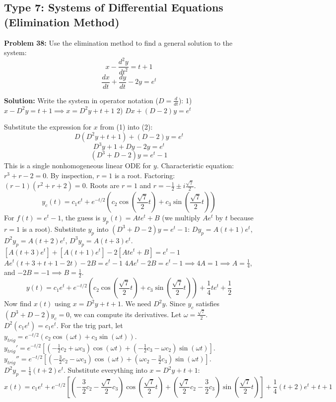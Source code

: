 \documentclass[11pt]{article}
\begin{document}
\subsection{Type 7: Systems of Differential Equations (Elimination Method)}

\textbf{Problem 38:} Use the elimination method to find a general solution to the system:
\[ x - \frac{d^2 y}{dt^2} = t + 1 \]
\[ \frac{dx}{dt} + \frac{dy}{dt} - 2y = e^t \]

\textbf{Solution:}
Write the system in operator notation ($D = \frac{d}{dt}$):
1) $x - D^2 y = t + 1 \implies x = D^2 y + t + 1$
2) $Dx + (D - 2)y = e^t$

Substitute the expression for $x$ from (1) into (2):
\[ D(D^2 y + t + 1) + (D - 2)y = e^t \]
\[ D^3 y + 1 + Dy - 2y = e^t \]
\[ (D^3 + D - 2)y = e^t - 1 \]
This is a single nonhomogeneous linear ODE for $y$.
Characteristic equation: $r^3 + r - 2 = 0$.
By inspection, $r = 1$ is a root. Factoring: $(r - 1)(r^2 + r + 2) = 0$.
Roots are $r = 1$ and $r = -\frac{1}{2} \pm i\frac{\sqrt{7}}{2}$.
\[ y_c(t) = c_1 e^t + e^{-t/2} \left( c_2 \cos\left(\frac{\sqrt{7}}{2}t\right) + c_3 \sin\left(\frac{\sqrt{7}}{2}t\right) \right) \]
For $f(t) = e^t - 1$, the guess is $y_p(t) = A t e^t + B$ (we multiply $A e^t$ by $t$ because $r=1$ is a root).
Substitute $y_p$ into $(D^3 + D - 2)y = e^t - 1$:
$D y_p = A(t+1)e^t$, $D^2 y_p = A(t+2)e^t$, $D^3 y_p = A(t+3)e^t$.
$[A(t+3)e^t] + [A(t+1)e^t] - 2[A t e^t + B] = e^t - 1$
$A e^t (t + 3 + t + 1 - 2t) - 2B = e^t - 1$
$4A e^t - 2B = e^t - 1 \implies 4A = 1 \implies A = \frac{1}{4}$, and $-2B = -1 \implies B = \frac{1}{2}$.
\[ y(t) = c_1 e^t + e^{-t/2} \left( c_2 \cos\left(\frac{\sqrt{7}}{2}t\right) + c_3 \sin\left(\frac{\sqrt{7}}{2}t\right) \right) + \frac{1}{4} t e^t + \frac{1}{2} \]
Now find $x(t)$ using $x = D^2 y + t + 1$.
We need $D^2 y$. Since $y_c$ satisfies $(D^3 + D - 2)y_c = 0$, we can compute its derivatives. Let $\omega = \frac{\sqrt{7}}{2}$.
$D^2(c_1 e^t) = c_1 e^t$.
For the trig part, let $y_{trig} = e^{-t/2}(c_2 \cos(\omega t) + c_3 \sin(\omega t))$.
$y_{trig}' = e^{-t/2} \left[ (-\frac{1}{2}c_2 + \omega c_3)\cos(\omega t) + (-\frac{1}{2}c_3 - \omega c_2)\sin(\omega t) \right]$.
$y_{trig}'' = e^{-t/2} \left[ (-\frac{3}{2}c_2 - \omega c_3)\cos(\omega t) + (\omega c_2 - \frac{3}{2}c_3)\sin(\omega t) \right]$.
$D^2 y_p = \frac{1}{4}(t+2)e^t$.
Substitute everything into $x = D^2 y + t + 1$:
\[ x(t) = c_1 e^t + e^{-t/2} \left[ \left(-\frac{3}{2}c_2 - \frac{\sqrt{7}}{2}c_3\right)\cos\left(\frac{\sqrt{7}}{2}t\right) + \left(\frac{\sqrt{7}}{2}c_2 - \frac{3}{2}c_3\right)\sin\left(\frac{\sqrt{7}}{2}t\right) \right] + \frac{1}{4}(t+2)e^t + t + 1 \]
\end{document}
